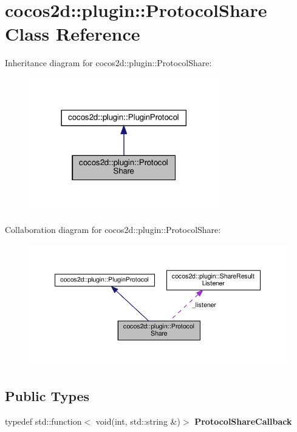 \hypertarget{classcocos2d_1_1plugin_1_1ProtocolShare}{}\section{cocos2d\+:\+:plugin\+:\+:Protocol\+Share Class Reference}
\label{classcocos2d_1_1plugin_1_1ProtocolShare}


Inheritance diagram for cocos2d\+:\+:plugin\+:\+:Protocol\+Share\+:
\nopagebreak
\begin{figure}[H]
\begin{center}
\leavevmode
\includegraphics[width=234pt]{classcocos2d_1_1plugin_1_1ProtocolShare__inherit__graph}
\end{center}
\end{figure}


Collaboration diagram for cocos2d\+:\+:plugin\+:\+:Protocol\+Share\+:
\nopagebreak
\begin{figure}[H]
\begin{center}
\leavevmode
\includegraphics[width=350pt]{classcocos2d_1_1plugin_1_1ProtocolShare__coll__graph}
\end{center}
\end{figure}
\subsection*{Public Types}
\begin{DoxyCompactItemize}
\item 
\mbox{\label{classcocos2d_1_1plugin_1_1ProtocolShare_a5991f3cd3ea6fcda6ab2bceff3c4c4b9}} 
typedef std\+::function$<$ void(int, std\+::string \&)$>$ {\bfseries Protocol\+Share\+Callback}
\end{DoxyCompactItemize}
